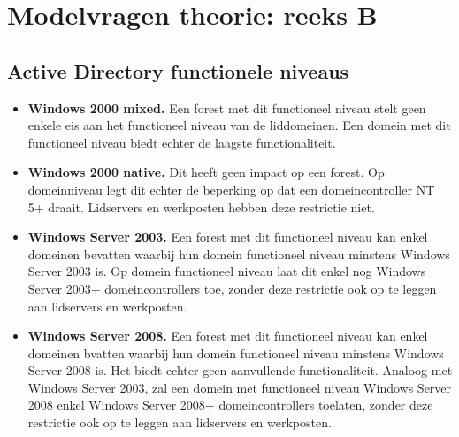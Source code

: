 \chapter{Modelvragen theorie: reeks B}
	\section{Active Directory functionele niveaus }
	\begin{enumerate}
		 {
			\begin{itemize}
				\item \textbf{Windows 2000 mixed.} Een forest met dit functioneel niveau stelt geen enkele eis aan het functioneel niveau van de liddomeinen. Een domein met dit functioneel niveau biedt echter de laagste functionaliteit. 
				\item \textbf{Windows 2000 native.} Dit heeft geen impact op een forest. Op domeinniveau legt dit echter de beperking op dat een domeincontroller NT 5+ draait. Lidservers en werkposten hebben deze restrictie niet.
				\item \textbf{Windows Server 2003.} Een forest met dit functioneel niveau kan enkel domeinen bevatten waarbij hun domein functioneel niveau minstens Windows Server 2003 is. Op domein functioneel niveau laat dit enkel nog Windows Server 2003+ domeincontrollers toe, zonder deze restrictie ook op te leggen aan lidservers en werkposten. 
				\item \textbf{Windows Server 2008.} Een forest met dit functioneel niveau kan enkel domeinen bvatten waarbij hun domein functioneel niveau minstens Windows Server 2008 is. Het biedt echter geen aanvullende functionaliteit. Analoog met Windows Server 2003, zal een domein met functioneel niveau Windows Server 2008 enkel Windows Server 2008+ domeincontrollers toelaten, zonder deze restrictie ook op te leggen aan lidservers en werkposten. 
			\end{itemize}
			
}
\end{enumerate}
